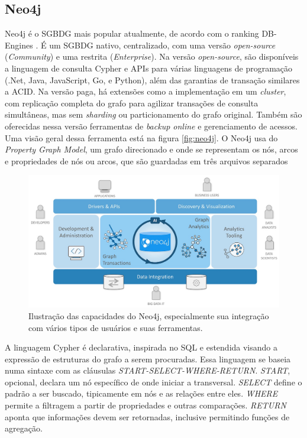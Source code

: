\documentclass[conference]{IEEEtran}
\begin{document}
\subsection{Neo4j}

Neo4j é o SGBDG mais popular atualmente, de acordo com o ranking DB-Engines \cite{db_engines}. É um SGBDG nativo, centralizado, com uma versão \emph{open-source} (\emph{Community}) e uma restrita (\emph{Enterprise}). Na versão \emph{open-source}, são disponíveis a linguagem de consulta Cypher e APIs para várias linguagens de programação (.Net, Java, JavaScript, Go, e Python), além das garantias de transação similares a ACID. Na versão paga, há extensões como a implementação em um \emph{cluster}, com replicação completa do grafo para agilizar transações de consulta simultâneas, mas sem \emph{sharding} ou particionamento do grafo original. Também são oferecidas nessa versão ferramentas de \emph{backup online} e gerenciamento de acessos. Uma visão geral dessa ferramenta está na figura \ref{fig:neo4j}. O Neo4j usa do \emph{Property Graph Model}, um grafo direcionado e onde se representam os nós, arcos e propriedades de nós ou arcos, que são guardadas em três arquivos separados

\begin{figure}[htbp]
\centerline{\includegraphics[width=0.9\linewidth]{img/neo4j/neo4j_graph_platform.jpg}}
\caption{Ilustração das capacidades do Neo4j, especialmente sua integração com vários tipos de usuários e suas ferramentas.}\label{fig:neo4j}
\label{fig}
\end{figure}

A linguagem Cypher é declarativa, inspirada no SQL e estendida visando a expressão de estruturas do grafo a serem procuradas. Essa linguagem se baseia numa sintaxe com as cláusulas \emph{START-SELECT-WHERE-RETURN}. \emph{START}, opcional, declara um nó específico de onde iniciar a transversal. \emph{SELECT} define o padrão a ser buscado, tipicamente em nós e as relações entre eles. \emph{WHERE} permite a filtragem a partir de propriedades e outras comparações. \emph{RETURN} aponta que informações devem ser retornadas, inclusive permitindo funções de agregação.
\end{document}
